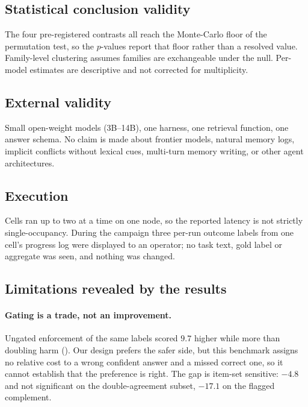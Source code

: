 \subsection{Statistical conclusion validity}

The four pre-registered contrasts all reach the Monte-Carlo floor of the permutation test, so the $p$-values
report that floor rather than a resolved value. Family-level clustering assumes families are exchangeable under
the null. Per-model estimates are descriptive and not corrected for multiplicity.

\subsection{External validity}

Small open-weight models (3B--14B), one harness, one retrieval function, one answer schema. No claim is made about
frontier models, natural memory logs, implicit conflicts without lexical cues, multi-turn memory writing, or other
agent architectures.

\subsection{Execution}

Cells ran up to two at a time on one node, so the reported latency is not strictly single-occupancy. During the
campaign three per-run outcome labels from one cell's progress log were displayed to an operator; no task text,
gold label or aggregate was seen, and nothing was changed.



\subsection{Limitations revealed by the results}

\paragraph{Gating is a trade, not an improvement.} Ungated enforcement of the same labels scored $9.7$\pp{}
higher while more than doubling harm (). Our design prefers the safer side, but this
benchmark assigns no relative cost to a wrong confident answer and a missed correct one, so it cannot establish
that the preference is right. The gap is item-set sensitive: $-4.8$\pp{} and not significant on the
double-agreement subset, $-17.1$\pp{} on the flagged complement.

